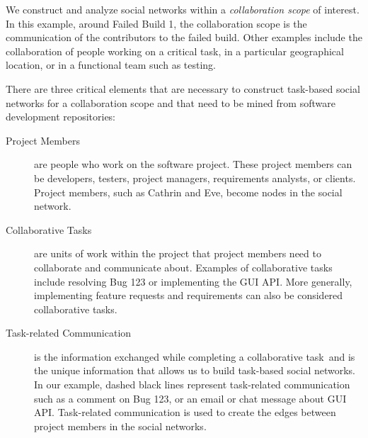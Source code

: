 \documentclass[12pt,oneside]{book}
\newcommand{\cu}{collaborative task}
\newcommand{\people}{project member}
\begin{document}
We construct and analyze social networks within a \emph{collaboration scope} of
interest. In this example, around Failed Build 1, the collaboration scope is the
communication of the contributors to the failed build. Other examples include the
collaboration of people working on a critical task, in a particular geographical
location, or in a functional team such as testing.

There are three critical elements that are necessary to construct task-based
social networks for a collaboration scope and that need to be mined from software
development repositories:

\begin{description}
\item[Project Members] are people who work on the software project. These
\people s can be developers, testers, project managers, requirements analysts,
or clients. Project members, such as Cathrin and Eve, become nodes in the
social network.

\item[Collaborative Tasks] are units of work within the project that \people s
need to collaborate and communicate about. Examples of \cu s include resolving
Bug  123 or implementing the GUI API. More generally, implementing feature
requests and requirements can also be considered collaborative tasks.

\item[Task-related Communication] is the information exchanged while completing
a \cu\ and is the unique information that allows us to build task-based social
networks. In our example, dashed black lines represent task-related communication
such as a comment on Bug 123, or an email or chat message about GUI API.
Task-related communication is used to create the edges between \people s in the
social networks.
\end{description}

\end{document}
